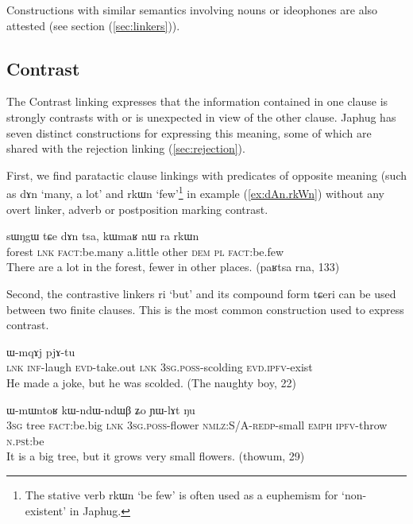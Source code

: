 \documentclass[oldfontcommands,oneside,a4paper,11pt]{article}
\newcommand{\ipa}[1]{{\phon \mbox{#1}}} %
\newcommand{\refb}[1]{(\ref{#1})}
\begin{document}
Constructions with similar semantics involving nouns or ideophones are also attested (see section \refb{sec:linkers}).
 
 
 
 
\subsection{Contrast} \label{sec:contrast}
The Contrast linking expresses that the information contained in one clause is strongly contrasts with or is unexpected in view of the other clause. Japhug has seven distinct constructions for expressing this meaning, some of which are shared with the rejection linking \refb{sec:rejection}.

First, we   find  paratactic clause linkings with predicates of opposite meaning (such as \ipa{dɤn} `many, a lot' and \ipa{rkɯn} `few'\footnote{The stative verb \ipa{rkɯn} `be few' is often used as a euphemism for `non-existent' in Japhug.} in example \refb{ex:dAn.rkWn} without any overt linker, adverb or postposition marking contrast.  

\begin{exe}
\ex \label{ex:dAn.rkWn}
\gll
 \ipa{sɯŋgɯ}  	\ipa{tɕe}  	\ipa{dɤn}  	\ipa{tsa,}  	\ipa{kɯmaʁ}  	\ipa{nɯ} \ipa{ra}  	\ipa{rkɯn}  \\
 forest \textsc{lnk} \textsc{fact}:be.many a.little other \textsc{dem} \textsc{pl} \textsc{fact}:be.few \\
\glt There are a lot in the forest, fewer in other places. (paʁtsa rna, 133)
\end{exe}

Second, the contrastive linkers \ipa{ri} `but' and its compound form \ipa{tɕeri} can be used between two finite clauses. This is the most common construction used to express contrast.
\begin{exe}
\ex \label{ex:ndAre.mWjmWm}
\gll
[\ipa{tɕe}  	\ipa{kɤ-nɤre}  	\ipa{pjɤ-tɕɤt}]  	\ipa{\textbf{ri}}  	\ipa{ɯ-mqɤj}  	\ipa{pjɤ-tu}  \\
\textsc{lnk} \textsc{inf}-laugh \textsc{evd}-take.out \textsc{lnk} \textsc{3sg.poss}-scolding
\textsc{evd.ipfv}-exist\\
\glt He made a joke, but he was scolded. (The naughty boy, 22)
\end{exe}

\begin{exe}
\ex \label{ex:wxti.ri}
\gll
[\ipa{ɯʑo}    	\ipa{si}    	\ipa{wxti}]    	\ipa{\textbf{ri},}    	\ipa{ɯ-mɯntoʁ}    	\ipa{kɯ-ndɯ-ndɯβ}    	\ipa{ʑo}    	\ipa{ɲɯ-lɤt}    	\ipa{ŋu}    \\
\textsc{3sg} tree \textsc{fact:}be.big \textsc{lnk} \textsc{3sg.poss}-flower \textsc{nmlz}:S/A-\textsc{redp}-small \textsc{emph} \textsc{ipfv}-throw \textsc{n.ps}t:be\\
\glt It is a big tree, but it grows very small flowers. (thowum, 29)
\end{exe}
\end{document}
